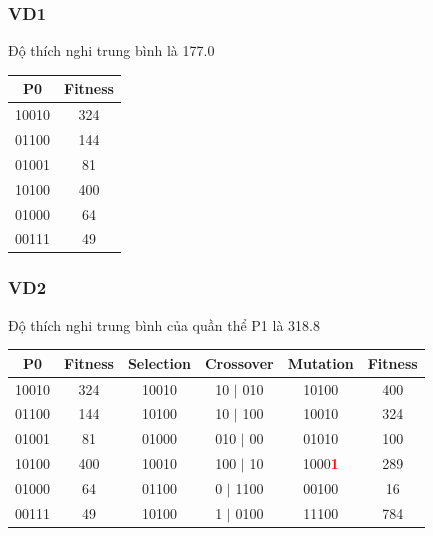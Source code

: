 \documentclass{book}
\begin{document}
\subsubsection{VD1} Độ thích nghi trung bình là 177.0
\begin{table}[H]
    \centering
    \begin{tabular}{|c|c|} %
    \hline
    \textbf{P0} & \textbf{Fitness} \\
    \hline
    10010 & 324 \\
    01100 & 144 \\
    01001 & 81 \\
    10100 & 400 \\
    01000 & 64 \\
    00111 & 49 \\
    \hline
    \end{tabular}
\end{table}

\subsubsection{VD2} Độ thích nghi trung bình của quần thể P1 là 318.8
\begin{table}[H]
    \centering
    \begin{tabular}{|c|c|c|c|c|c|}
    \hline
    \textbf{P0} & \textbf{Fitness} & \textbf{Selection} & \textbf{Crossover} & \textbf{Mutation} & \textbf{Fitness} \\
    \hline
    10010 & 324 & 10010 & 10 $|$ 010 & 10100 & 400 \\
    01100 & 144 & 10100 & 10 $|$ 100 & 10010 & 324 \\
    01001 & 81 & 01000 & 010 $|$ 00 & 01010 & 100 \\
    10100 & 400 & 10010 & 100 $|$ 10 & 1000\textcolor{red}{\textbf{1}} & 289 \\ %
    01000 & 64 & 01100 & 0 $|$ 1100 & 00100 & 16 \\
    00111 & 49 & 10100 & 1 $|$ 0100 & 11100 & 784 \\
    \hline
    \end{tabular}
\end{table}
\end{document}
